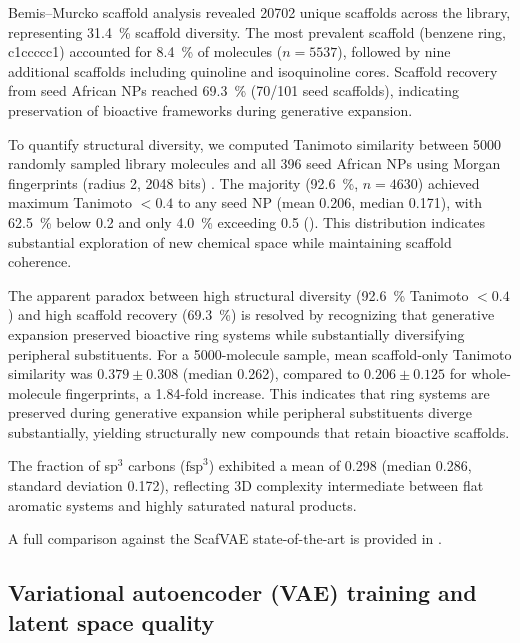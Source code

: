 \documentclass[journal=jcisd8,manuscript=article]{achemso}
\begin{document}
Bemis--Murcko scaffold analysis revealed \num{20702} unique scaffolds across the library, representing \qty{31.4}{\percent} scaffold diversity. The most prevalent scaffold (benzene ring, c1ccccc1) accounted for \qty{8.4}{\percent} of molecules ($n = \num{5537}$), followed by nine additional scaffolds including quinoline and isoquinoline cores. Scaffold recovery from seed African NPs reached \qty{69.3}{\percent} (\num{70}/\num{101} seed scaffolds), indicating preservation of bioactive frameworks during generative expansion.

To quantify structural diversity, we computed Tanimoto similarity between \num{5000} randomly sampled library molecules and all \num{396} seed African NPs using Morgan fingerprints (radius \num{2}, \num{2048} bits) \cite{Rogers2010, Morgan1965}. The majority (\qty{92.6}{\percent}, $n = \num{4630}$) achieved maximum Tanimoto $< \num{0.4}$ to any seed NP (mean \num{0.206}, median \num{0.171}), with \qty{62.5}{\percent} below \num{0.2} and only \qty{4.0}{\percent} exceeding \num{0.5} (). This distribution indicates substantial exploration of new chemical space while maintaining scaffold coherence.

The apparent paradox between high structural diversity (\qty{92.6}{\percent} Tanimoto $< \num{0.4}$) and high scaffold recovery (\qty{69.3}{\percent}) is resolved by recognizing that generative expansion preserved bioactive ring systems while substantially diversifying peripheral substituents. For a \num{5000}-molecule sample, mean scaffold-only Tanimoto similarity was $\num{0.379} \pm \num{0.308}$ (median \num{0.262}), compared to $\num{0.206} \pm \num{0.125}$ for whole-molecule fingerprints, a \num{1.84}-fold increase. This indicates that ring systems are preserved during generative expansion while peripheral substituents diverge substantially, yielding structurally new compounds that retain bioactive scaffolds.

The fraction of sp$^3$ carbons ($\text{fsp}^3$) exhibited a mean of \num{0.298} (median \num{0.286}, standard deviation \num{0.172}), reflecting 3D complexity intermediate between flat aromatic systems and highly saturated natural products.

A full comparison against the ScafVAE state-of-the-art is provided in .

\subsection{Variational autoencoder (VAE) training and latent space quality}
\label{sec:vae_training}
\end{document}
